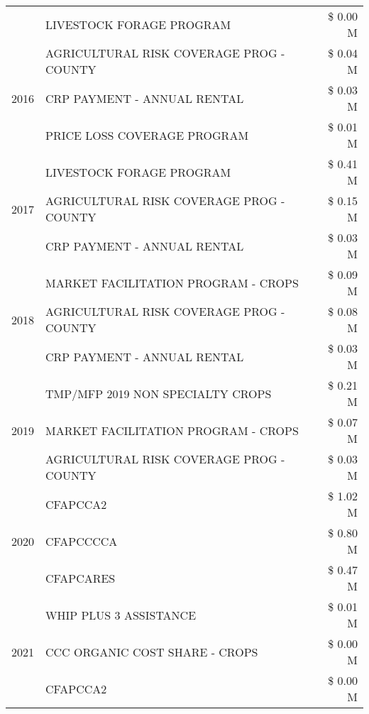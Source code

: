 \begin{tabular}{llr}
 & LIVESTOCK FORAGE PROGRAM & \$ 0.00 M \\
\cline{1-3}
\multirow[t]{3}{*}{2016} & AGRICULTURAL RISK COVERAGE PROG - COUNTY & \$ 0.04 M \\
 & CRP PAYMENT - ANNUAL RENTAL & \$ 0.03 M \\
 & PRICE LOSS COVERAGE PROGRAM & \$ 0.01 M \\
\cline{1-3}
\multirow[t]{3}{*}{2017} & LIVESTOCK FORAGE PROGRAM & \$ 0.41 M \\
 & AGRICULTURAL RISK COVERAGE PROG - COUNTY & \$ 0.15 M \\
 & CRP PAYMENT - ANNUAL RENTAL & \$ 0.03 M \\
\cline{1-3}
\multirow[t]{3}{*}{2018} & MARKET FACILITATION PROGRAM - CROPS & \$ 0.09 M \\
 & AGRICULTURAL RISK COVERAGE PROG - COUNTY & \$ 0.08 M \\
 & CRP PAYMENT - ANNUAL RENTAL & \$ 0.03 M \\
\cline{1-3}
\multirow[t]{3}{*}{2019} & TMP/MFP 2019 NON SPECIALTY CROPS & \$ 0.21 M \\
 & MARKET FACILITATION PROGRAM - CROPS & \$ 0.07 M \\
 & AGRICULTURAL RISK COVERAGE PROG - COUNTY & \$ 0.03 M \\
\cline{1-3}
\multirow[t]{3}{*}{2020} & CFAPCCA2 & \$ 1.02 M \\
 & CFAPCCCCA & \$ 0.80 M \\
 & CFAPCARES & \$ 0.47 M \\
\cline{1-3}
\multirow[t]{3}{*}{2021} & WHIP PLUS 3 ASSISTANCE & \$ 0.01 M \\
 & CCC ORGANIC COST SHARE - CROPS & \$ 0.00 M \\
 & CFAPCCA2 & \$ 0.00 M \\
\cline{1-3}
\bottomrule
\end{tabular}

